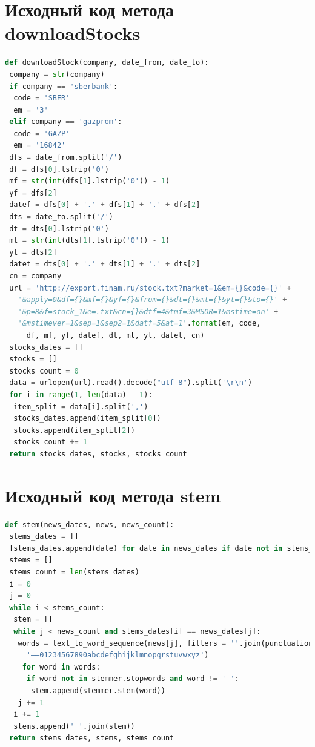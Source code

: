 \documentclass[14pt]{matmex-diploma-custom}
\begin{document}
\begin{appendices}
\section{Исходный код метода downloadStocks}

\label{app:downloadStocks}

\begin{footnotesize}
\begin{lstlisting}[language=Python]
def downloadStock(company, date_from, date_to):
 company = str(company)
 if company == 'sberbank':
  code = 'SBER'
  em = '3'
 elif company == 'gazprom':
  code = 'GAZP'
  em = '16842'
 dfs = date_from.split('/')
 df = dfs[0].lstrip('0')
 mf = str(int(dfs[1].lstrip('0')) - 1)
 yf = dfs[2]
 datef = dfs[0] + '.' + dfs[1] + '.' + dfs[2]
 dts = date_to.split('/')
 dt = dts[0].lstrip('0')
 mt = str(int(dts[1].lstrip('0')) - 1)
 yt = dts[2]
 datet = dts[0] + '.' + dts[1] + '.' + dts[2]
 cn = company
 url = 'http://export.finam.ru/stock.txt?market=1&em={}&code={}' +
   '&apply=0&df={}&mf={}&yf={}&from={}&dt={}&mt={}&yt={}&to={}' +
   '&p=8&f=stock_1&e=.txt&cn={}&dtf=4&tmf=3&MSOR=1&mstime=on' +
   '&mstimever=1&sep=1&sep2=1&datf=5&at=1'.format(em, code, 
     df, mf, yf, datef, dt, mt, yt, datet, cn)
 stocks_dates = []
 stocks = []
 stocks_count = 0
 data = urlopen(url).read().decode("utf-8").split('\r\n')
 for i in range(1, len(data) - 1):
  item_split = data[i].split(',')
  stocks_dates.append(item_split[0])
  stocks.append(item_split[2])
  stocks_count += 1
 return stocks_dates, stocks, stocks_count
\end{lstlisting}
\end{footnotesize}

\section{Исходный код метода stem}

\label{app:stem}

\begin{footnotesize}
\begin{lstlisting}[language=Python]
def stem(news_dates, news, news_count):
 stems_dates = []
 [stems_dates.append(date) for date in news_dates if date not in stems_dates]
 stems = []
 stems_count = len(stems_dates)
 i = 0
 j = 0
 while i < stems_count:
  stem = []
  while j < news_count and stems_dates[i] == news_dates[j]:
   words = text_to_word_sequence(news[j], filters = ''.join(punctuation) + 
     '–—01234567890abcdefghijklmnopqrstuvwxyz')
    for word in words:
     if word not in stemmer.stopwords and word != ' ':
      stem.append(stemmer.stem(word))
   j += 1
  i += 1
  stems.append(' '.join(stem))
 return stems_dates, stems, stems_count
\end{lstlisting}
\end{footnotesize}


\end{appendices}
\end{document}
